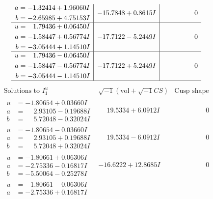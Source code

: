 \documentclass[1p]{elsarticle_modified}
\theoremstyle{definition}
\newcommand{\I}{\sqrt{-1}}
\begin{document}
$$\begin{array}{c|c|c}
\begin{aligned}
a &= -1.32414 + 1.96060 I \\
b &= -2.65985 + 4.75153 I\end{aligned}
 & -15.7848 + 0.8615 I & \phantom{-0.000000 } 0 \\ \hline\begin{aligned}
u &= \phantom{-}1.79436 + 0.06450 I \\
a &= -1.58447 + 0.56774 I \\
b &= -3.05444 + 1.14510 I\end{aligned}
 & -17.7122 - 5.2449 I & \phantom{-0.000000 } 0 \\ \hline\begin{aligned}
u &= \phantom{-}1.79436 - 0.06450 I \\
a &= -1.58447 - 0.56774 I \\
b &= -3.05444 - 1.14510 I\end{aligned}
 & -17.7122 + 5.2449 I & \phantom{-0.000000 } 0\\
 \hline 
 \end{array}$$\newpage$$\begin{array}{c|c|c}  
\text{Solutions to }I^u_{1}& \I (\text{vol} + \sqrt{-1}CS) & \text{Cusp shape}\\
 \hline 
\begin{aligned}
u &= -1.80654 + 0.03660 I \\
a &= \phantom{-}2.93105 - 0.19688 I \\
b &= \phantom{-}5.72048 - 0.32024 I\end{aligned}
 & \phantom{-}19.5334 + 6.0912 I & \phantom{-0.000000 } 0 \\ \hline\begin{aligned}
u &= -1.80654 - 0.03660 I \\
a &= \phantom{-}2.93105 + 0.19688 I \\
b &= \phantom{-}5.72048 + 0.32024 I\end{aligned}
 & \phantom{-}19.5334 - 6.0912 I & \phantom{-0.000000 } 0 \\ \hline\begin{aligned}
u &= -1.80661 + 0.06306 I \\
a &= -2.75336 - 0.16817 I \\
b &= -5.50064 - 0.25278 I\end{aligned}
 & -16.6222 + 12.8685 I & \phantom{-0.000000 } 0 \\ \hline\begin{aligned}
u &= -1.80661 - 0.06306 I \\
a &= -2.75336 + 0.16817 I \\

\end{aligned}
\end{array}$$
\end{document}
